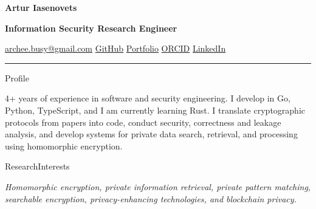 \documentclass[11pt,a4paper]{article}
\newcommand{\cvrow}[2]{%
  \noindent
  \begin{minipage}[t]{0.145\textwidth}
    \vspace{0pt}%
    \raggedright
    \fontsize{10.5}{12.5}\selectfont
    #1
  \end{minipage}%
  \hfill
  \begin{minipage}[t]{0.835\textwidth}
    \vspace{0pt}%
    #2
  \end{minipage}\par
}
\begin{document}
{\fontsize{24}{28}\selectfont\bfseries Artur Iasenovets}\par
\vspace{0.08em}
{\large\bfseries Information Security Research Engineer}\par
\vspace{0.28em}
\href{mailto:archee.busy@gmail.com}{archee.busy@gmail.com}
\;\textbullet\;
\href{https://github.com/iasenovets}{GitHub}
\;\textbullet\;
\href{https://iasenovets.github.io/}{Portfolio}
\;\textbullet\;
\href{https://orcid.org/0009-0008-0008-3746}{ORCID}
\;\textbullet\;
\href{https://linkedin.com/in/iasenovets}{LinkedIn}
\par
\vspace{0.22em}
\hrule
\vspace{0.55em}

\cvrow{Profile}{%
  4+ years of experience in software and security engineering. I develop in Go,
  Python, TypeScript, and I am currently learning Rust. I translate cryptographic protocols
  from papers into code, conduct security, correctness and leakage analysis, and develop
  systems for private data search, retrieval, and processing using homomorphic encryption.
}

\vspace{0.55em}

\cvrow{Research\newline Interests}{%
  \textit{Homomorphic encryption, private information retrieval, private pattern matching,
  searchable encryption, privacy-enhancing technologies, and blockchain privacy.}
}

\vspace{0.75em}
\end{document}
